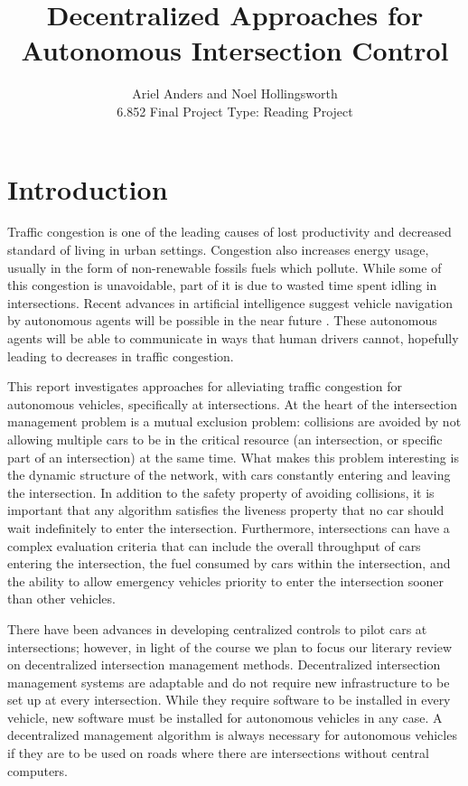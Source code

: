 \documentclass[12pt]{article}
\title{Decentralized Approaches for Autonomous Intersection Control }
\author{Ariel Anders and Noel Hollingsworth\\ 6.852 Final Project Type: Reading Project}
\begin{document}
\maketitle 

\pagebreak
\tableofcontents
\pagebreak

\section{Introduction}

Traffic congestion is one of the leading causes of lost productivity and decreased standard of living in urban settings. Congestion also increases energy usage, usually in the form of non-renewable fossils fuels which pollute. While some of this congestion is unavoidable, part of it is due to wasted time spent idling in intersections. Recent advances in artificial intelligence suggest vehicle navigation by autonomous agents will be possible in the near future \cite{dresner}. These autonomous agents will be able to communicate in ways that human drivers cannot, hopefully leading to decreases in traffic congestion.

This report investigates approaches for alleviating traffic congestion for autonomous vehicles, specifically at intersections. At the heart of the intersection management problem is a mutual exclusion problem: collisions are avoided by not allowing multiple cars to be in the critical resource (an intersection, or specific part of an intersection) at the same time.  What makes this problem interesting is the dynamic structure of the network, with cars constantly entering and leaving the intersection.  In addition to the safety property of avoiding collisions, it is important that any algorithm satisfies the liveness property that no car should wait indefinitely to enter the intersection.  Furthermore, intersections can have a complex evaluation criteria that can include the overall throughput of cars entering the intersection, the fuel consumed by cars within the intersection, and the ability to allow emergency vehicles priority to enter the intersection sooner than other vehicles. 

There have been advances in developing centralized controls to pilot cars at intersections; however, in light of the course we plan to focus our literary review on decentralized intersection management methods.  Decentralized intersection management systems are adaptable and do not require new infrastructure to be set up at every intersection. While they require software to be installed in every vehicle, new software must be installed for autonomous vehicles in any case. A decentralized management algorithm is always necessary for autonomous vehicles if they are to be used on roads where there are intersections without central computers.
\end{document}
